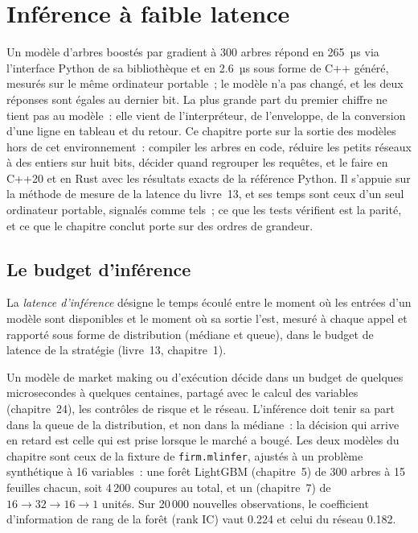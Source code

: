 \chapter{Inférence à faible latence}\label{ch:ml:low-latency-inference}

Un modèle d'arbres boostés par gradient à 300 arbres répond en 265~µs via l'interface Python de sa bibliothèque et en 2.6~µs
sous forme de C++ généré, mesurés sur le même ordinateur portable~; le modèle n'a pas changé, et les deux réponses sont égales au
dernier bit. La plus grande part du premier chiffre ne tient pas au modèle~: elle vient de l'interpréteur, de l'enveloppe, de la conversion
d'une ligne en tableau et du retour. Ce chapitre porte sur la sortie des modèles hors de cet environnement~: compiler les arbres en code, réduire les petits
réseaux à des entiers sur huit bits, décider quand regrouper les requêtes, et le faire en C++20 et en Rust avec les résultats exacts de la référence
Python. Il s'appuie sur la méthode de mesure de la latence du livre~13, et ses temps sont ceux d'un seul ordinateur portable, signalés comme tels~;
ce que les tests vérifient est la parité, et ce que le chapitre conclut porte sur des ordres de grandeur.

\section{Le budget d'inférence}

\begin{definition}\label{def:ml:low-latency-inference:latency}
La \emph{latence d'inférence} désigne le temps écoulé entre le moment où les entrées d'un modèle sont disponibles et le moment
où sa sortie l'est, mesuré à chaque appel et rapporté sous forme de distribution (médiane et queue), dans le budget de latence de la stratégie
(livre~13, chapitre~1).
\end{definition}

Un modèle de market making ou d'exécution décide dans un budget de quelques microsecondes à quelques centaines, partagé avec
le calcul des variables (chapitre~24), les contrôles de risque et le réseau. L'inférence doit tenir sa part dans la queue de la distribution, et non dans la médiane~: la décision
qui arrive en retard est celle qui est prise lorsque le marché a bougé. Les deux modèles du chapitre sont ceux
de la fixture de \texttt{firm.mlinfer}, ajustés à un problème synthétique à 16 variables~: une forêt LightGBM (chapitre~5) de 300 arbres à 15 feuilles chacun, soit 4\,200
coupures au total, et un  (chapitre~7) de $16\to32\to16\to1$ unités. Sur 20\,000 nouvelles observations, le coefficient d'information de rang de la forêt
(rank IC) vaut 0.224 et celui du réseau 0.182.

